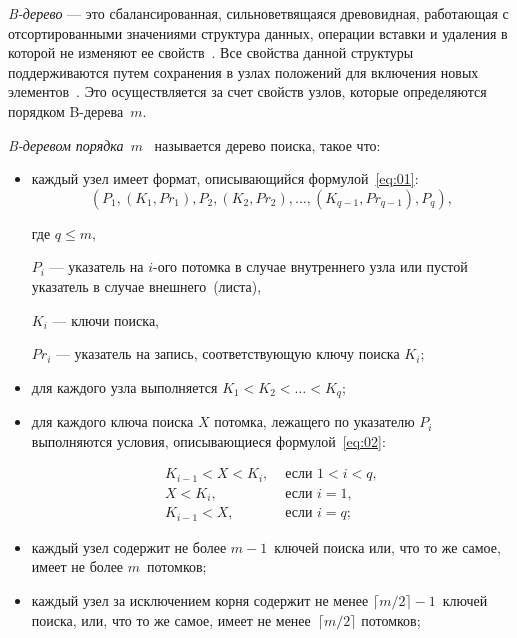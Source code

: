 \textit{B-дерево} --- это сбалансированная, сильноветвящаяся древовидная,
работающая с отсортированными значениями структура данных, операции вставки и
удаления в которой не изменяют ее свойств~\cite{loshad}. Все свойства данной
структуры поддерживаются путем сохранения в узлах положений для включения новых
элементов~\cite{baw}. Это осуществляется за счет свойств узлов, которые
определяются порядком B-дерева~$m$.

\textit{B-деревом порядка~$m$}~\cite{baw, arki} называется дерево поиска, такое
что:

\begin{itemize}
    \item каждый узел имеет формат, описывающийся формулой~\eqref{eq:01}:
        \begin{equation}\label{eq:01}
            (P_1, (K_1, Pr_1), P_2, (K_2, Pr_2), \dots, (K_{q-1}, Pr_{q-1}),
            P_q),
        \end{equation}

        где $q \leqslant m$,

        $P_i$ --- указатель на $i$-ого потомка в случае внутреннего узла или
        пустой указатель в случае внешнего~(листа),

        $K_i$ --- ключи поиска,

        $Pr_i$ --- указатель на запись, соответствующую ключу поиска $K_i$;

    \item для каждого узла выполняется $K_1 < K_2 < \dots < K_q$;

    \item для каждого ключа поиска $X$ потомка, лежащего по указателю $P_i$
        выполняются условия, описывающиеся формулой~\eqref{eq:02}:

        \begin{equation}\label{eq:02}
            \begin{aligned}
                K_{i-1} < X < K_i, & \text{ если } 1 < i < q,\\
                X < K_i, & \text{ если } i = 1,\\
                K_{i-1} < X, & \text{ если } i = q;
            \end{aligned}
        \end{equation}

    \item каждый узел содержит не более $m - 1$~ключей поиска или, что то же
        самое, имеет не более $m$~потомков;

    \item каждый узел за исключением корня содержит не менее $\lceil m / 2
        \rceil - 1$~ключей поиска, или, что то же самое, имеет не менее~$\lceil
        m / 2 \rceil$ потомков;


\end{itemize}
